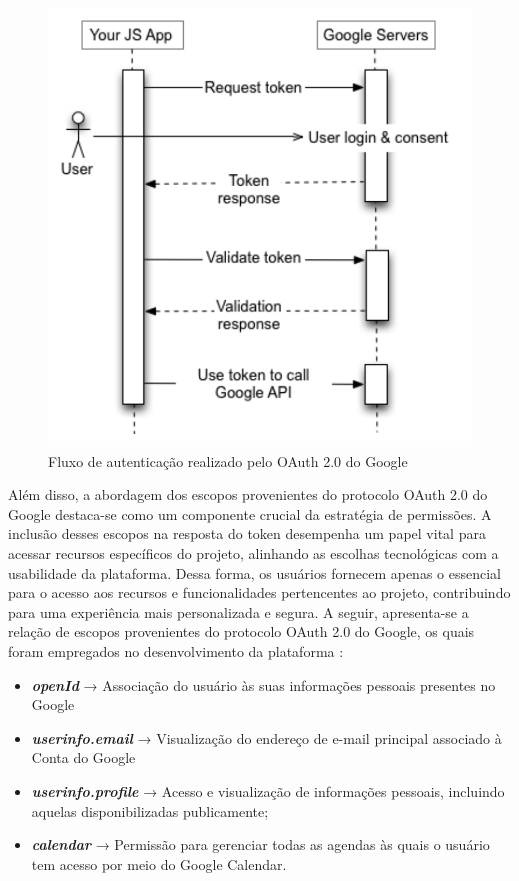 \begin{figure}[!ht] %
    \centering
    \includegraphics[scale=0.5]{latex/figuras/oauth.pdf}
    \caption[Fluxo de autenticação OAuth 2.0 do Google]
    {Fluxo de autenticação realizado pelo OAuth 2.0 do Google}
\end{figure}

\pagebreak Além disso, a abordagem dos escopos provenientes do protocolo OAuth 2.0 do Google destaca-se como um componente crucial da estratégia de permissões. A inclusão desses escopos na resposta do token desempenha um papel vital para acessar recursos específicos do projeto, alinhando as escolhas tecnológicas com a usabilidade da plataforma. Dessa forma, os usuários fornecem apenas o essencial para o acesso aos recursos e funcionalidades pertencentes ao projeto, contribuindo para uma experiência mais personalizada e segura. A seguir, apresenta-se a relação de escopos provenientes do protocolo OAuth 2.0 do Google, os quais foram empregados no desenvolvimento da plataforma \cite{OAUTHSCOPES}:

\begin{itemize}
\item \textit{\textbf{openId}} → Associação do usuário às suas informações pessoais presentes no Google

\item \textit{\textbf{userinfo.email}} → Visualização do endereço de e-mail principal associado à Conta do Google

\item \textit{\textbf{userinfo.profile}} → Acesso e visualização de informações pessoais, incluindo aquelas disponibilizadas publicamente;
\item \textit{\textbf{calendar}} → Permissão para gerenciar todas as agendas às quais o usuário tem acesso por meio do Google Calendar.
\end{itemize}


